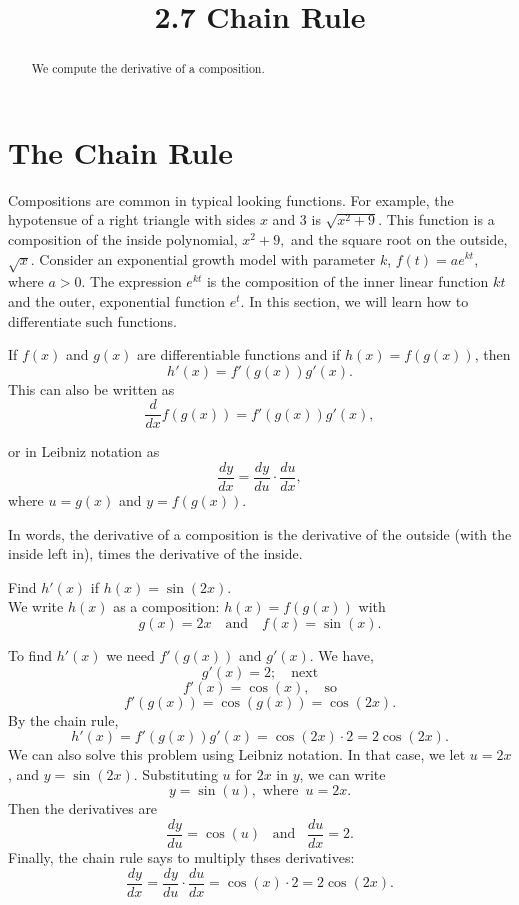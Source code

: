 \documentclass[handout]{ximera}
\title{2.7 Chain Rule}
\begin{document}
\begin{abstract}
We compute the derivative of  a composition.
\end{abstract}

\maketitle

\section{The Chain Rule}

Compositions are common in typical looking functions.
For example, the hypotensue of a right triangle with sides $x$ and $3$ is $\sqrt{x^2 + 9}$.  This function is a composition of the inside polynomial, $x^2 + 9,$
and the square root on the outside, $\sqrt{x}$.
Consider an exponential growth model with parameter $k$, $f(t) = ae^{kt}$, where $a>0$. The expression $e^{kt}$ is the composition of the inner linear function $kt$
and the outer, exponential function $e^t$. In this section, we will learn how to differentiate such functions.
\begin{theorem} If $f(x)$ and $g(x)$ are differentiable functions and if $h(x) = f(g(x))$, then
\[
h'(x) = f'(g(x))g'(x).
\]
This can also be written as 
\[
\frac{d}{dx}f(g(x)) = f'(g(x))g'(x),
\]

or in Leibniz notation as 
\[
\frac{dy}{dx} = \frac{dy}{du} \cdot \frac{du}{dx},
\]
where $u = g(x)$ and $y= f(g(x))$.
\end{theorem}



In words, the derivative of a composition is the derivative of the outside (with the inside left in),   
times the derivative of the inside.



\begin{example}[example 1]
Find $h'(x)$ if $h(x) = \sin(2x)$.\\
We write $h(x)$ as a composition: $h(x)=f(g(x))$ with
\[g(x) = 2x   \quad \text{and} \quad  f(x) = \sin(x).\]


To find $h'(x)$ we need $f'(g(x))$ and $g'(x)$. We have,
\[g'(x) = 2; \quad \text{next} \]
\[f'(x) = \cos(x), \quad \text{so}\]
\[f'(g(x)) =\cos(g(x)) = \cos(2x).\]
By the chain rule,
\[h'(x) = f'(g(x))g'(x) = \cos(2x) \cdot 2 = 2\cos(2x).\]
We can also solve this problem using Leibniz notation.  In that case, we let $u = 2x$, and $y=\sin(2x)$.
Substituting $u$ for $2x$ in $y$, we can write 
\[
y = \sin(u),  \text{ where } \, u = 2x.
\]
Then the derivatives are
\[
\frac{dy}{du} = \cos(u)  \,\,\,\text{  and  }  \,\,\,\frac{du}{dx} = 2.
\]
Finally, the chain rule says to multiply thses derivatives:
\[
\frac{dy}{dx} = \frac{dy}{du} \cdot \frac{du}{dx} = \cos(x) \cdot 2 = 2\cos(2x).
\]
\end{example}
\end{document}
